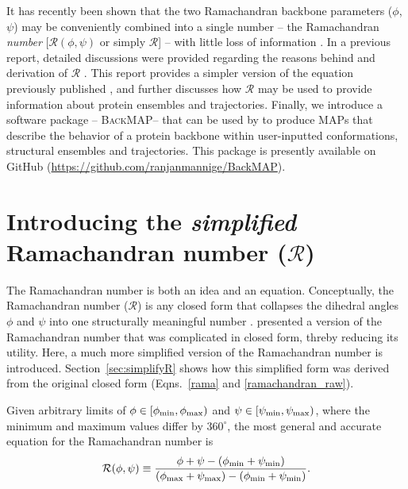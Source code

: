 \documentclass[fleqn,10pt,lineno]{wlpeerj} %
\newcommand{\Eqns}[1]{Eqns.~\ref{#1}}
\newcommand{\gname}{BackMAP}
\newcommand{\pname}{\textsc{\gname}\xspace}
\begin{document}
It has recently been shown that the two Ramachandran backbone parameters ($\phi$,$\psi$) may be conveniently combined into a single number -- the Ramachandran \textit{number} [$\mathcal{R}(\phi,\psi)$ or simply $\mathcal{R}$] -- with little loss of information . 
In a previous report, detailed discussions were provided regarding the reasons behind and derivation of $\mathcal{R}$ \citep{Mannige2016}. This report provides a simpler version of the equation previously published \citep{Mannige2016}, and further discusses how $\mathcal{R}$ may be used to provide information about protein ensembles and trajectories. 
Finally, we introduce a software package -- \pname -- that can be used by to produce MAPs that describe the behavior of a protein backbone within user-inputted conformations, structural ensembles and trajectories. This package is presently available on GitHub (\url{https://github.com/ranjanmannige/\gname}).

\section*{Introducing the \textit{simplified} Ramachandran number ($\mathcal{R}$)}

The Ramachandran number is both an idea and an equation. Conceptually, the Ramachandran number ($\mathcal{R}$) is any closed form that collapses the dihedral angles $\phi$ and $\psi$ into one structurally meaningful number \citep{Mannige2016}. \cite{Mannige2016} presented a version of the Ramachandran number that was complicated in closed form, threby reducing its utility. Here, a much more simplified version of the Ramachandran number is introduced. Section~\ref{sec:simplifyR} shows how this simplified form was derived from the original closed form (\Eqns{rama} and \ref{ramachandran_raw}).


Given arbitrary limits of $\phi \in [\phi_{\rm min},\phi_{\rm max})$ and $\psi \in [\psi_{\rm min},\psi_{\rm max})$, where the minimum and maximum values differ by $360^\circ$, the most general and accurate equation for the Ramachandran number is
\begin{equation}
{\mathcal{R}}(\phi,\psi) \equiv  \frac{\phi+\psi-(\phi_{\rm min}+\psi_{\rm min})}{(\phi_{\rm max}+\psi_{\rm max})-(\phi_{\rm min}+\psi_{\rm min})}.
\label{ramaGeneral}
\end{equation}
\end{document}
